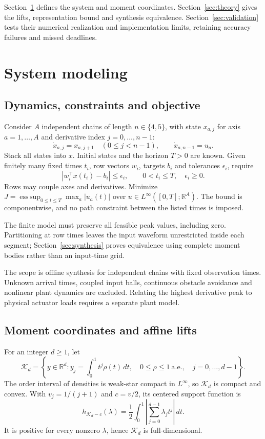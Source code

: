 \documentclass[pdflatex,sn-mathphys-num]{sn-jnl}
\theoremstyle{thmstyleone}
\theoremstyle{thmstyletwo}\newtheorem{remark}[theorem]{Remark}
\newcommand{\R}{\mathbb R}
\newcommand{\K}{\mathcal K}
\newcommand{\esssup}{\operatorname*{ess\,sup}}
\begin{document}
Section~\ref{sec:control-problem} defines the system and moment coordinates.
Section~\ref{sec:theory} gives the lifts, representation bound and synthesis
equivalence. Section~\ref{sec:validation} tests their numerical realization
and implementation limits, retaining accuracy failures and missed deadlines.

\section{System modeling}\label{sec:control-problem}
\subsection{Dynamics, constraints and objective}
Consider $A$ independent chains of length $n\in\{4,5\}$, with state
$x_{a,j}$ for axis $a=1,\ldots,A$ and derivative index $j=0,\ldots,n-1$:
\[
 \dot x_{a,j}=x_{a,j+1}\quad (0\le j<n-1),\qquad
 \dot x_{a,n-1}=u_a.
\]
Stack all states into $x$. Initial states and the horizon $T>0$ are known.
Given finitely many fixed times $t_i$, row vectors $w_i$, targets $b_i$ and
tolerances $\epsilon_i$, require
\begin{equation}\label{eq:waypoints}
 |w_i^\top x(t_i)-b_i|\le\epsilon_i,\qquad 0<t_i\le T,
 \quad\epsilon_i\ge0.
\end{equation}
Rows may couple axes and derivatives. Minimize
$J=\esssup_{0\le t\le T}\max_a|u_a(t)|$ over
$u\in L^\infty([0,T];\R^A)$.
The bound is componentwise, and no path constraint between the listed
times is imposed.

The finite model must preserve all feasible peak values, including zero.
Partitioning at row times leaves the input waveform unrestricted inside each
segment; Section~\ref{sec:synthesis} proves equivalence using complete moment
bodies rather than an input-time grid.

The scope is offline synthesis for independent chains with fixed observation
times. Unknown arrival times, coupled input balls, continuous obstacle
avoidance and nonlinear plant dynamics are excluded. Relating the highest
derivative peak to physical actuator loads requires a separate plant model.

\subsection{Moment coordinates and affine lifts}\label{sec:moments}
For an integer $d\ge1$, let
\begin{equation}\label{eq:body}
 \K_d=\left\{y\in\R^d:y_j=\int_0^1 t^j\rho(t)\,dt,
 \quad 0\le\rho\le1\ \text{a.e.},\quad j=0,\ldots,d-1\right\}.
\end{equation}
The order interval of densities is weak-star compact in $L^\infty$, so
$\K_d$ is compact and convex. With $v_j=1/(j+1)$ and $c=v/2$, its centered
support function is
\begin{equation}\label{eq:support}
 h_{\K_d-c}(\lambda)=\frac12\int_0^1
 \left|\sum_{j=0}^{d-1}\lambda_jt^j\right|\,dt.
\end{equation}
It is positive for every nonzero $\lambda$, hence $\K_d$ is full-dimensional.
\end{document}
